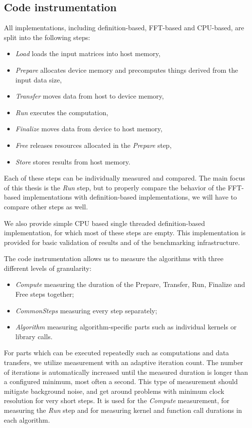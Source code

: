 \subsection{Code instrumentation}
\label{sec:code_instrumentation}

All implementations, including definition-based, FFT-based and CPU-based, are split into the following steps:

\begin{itemize}
	\item \textit{Load} loads the input matrices into host memory,
	\item \textit{Prepare} allocates device memory and precomputes things derived from the input data size,
	\item \textit{Transfer} moves data from host to device memory,
	\item \textit{Run} executes the computation,
	\item \textit{Finalize} moves data from device to host memory,
	\item \textit{Free} releases resources allocated in the \textit{Prepare} step,
	\item \textit{Store} stores results from host memory.
\end{itemize}

Each of these steps can be individually measured and compared. The main focus of this thesis is the \textit{Run} step, but to properly compare the behavior of the FFT-based implementations with definition-based implementations, we will have to compare other steps as well.

We also provide simple CPU based single threaded definition-based implementation, for which most of these steps are empty. This implementation is provided for basic validation of results and of the benchmarking infrastructure. 


The code instrumentation allows us to measure the algorithms with three different levels of granularity:
\begin{itemize}
	\item \textit{Compute} measuring the duration of the Prepare, Transfer, Run, Finalize and Free steps together;
	\item \textit{CommonSteps} measuring every step separately;
	\item \textit{Algorithm} measuring algorithm-specific parts such as individual kernels or library calls.
\end{itemize}

For parts which can be executed repeatedly such as computations and data transfers, we utilize measurement with an adaptive iteration count. The number of iterations is automatically increased until the measured duration is longer than a configured minimum, most often a second. This type of measurement should mitigate background noise, and get around problems with minimum clock resolution for very short steps. It is used for the \textit{Compute} measurement, for measuring the \textit{Run} step and for measuring kernel and function call durations in each algorithm.

